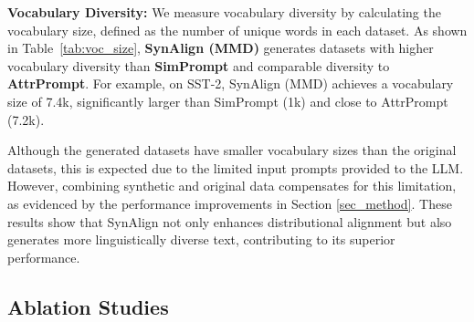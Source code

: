 \noindent \textbf{Vocabulary Diversity:}  
We measure vocabulary diversity by calculating the vocabulary size, defined as the number of unique words in each dataset. As shown in Table~\ref{tab:voc_size}, \textbf{SynAlign (MMD)} generates datasets with higher vocabulary diversity than \textbf{SimPrompt} and comparable diversity to \textbf{AttrPrompt}. For example, on SST-2, SynAlign (MMD) achieves a vocabulary size of 7.4k, significantly larger than SimPrompt (1k) and close to AttrPrompt (7.2k).

Although the generated datasets have smaller vocabulary sizes than the original datasets, this is expected due to the limited input prompts provided to the LLM. However, combining synthetic and original data compensates for this limitation, as evidenced by the performance improvements in Section \ref{sec_method}. These results show that SynAlign not only enhances distributional alignment but also generates more linguistically diverse text, contributing to its superior performance.

\begin{table}[tbp]
\centering
\caption{Vocabulary sizes of original datasets and synthetic datasets generated by different methods.}
\label{tab:voc_size}
\end{table}



\subsection{Ablation Studies}

